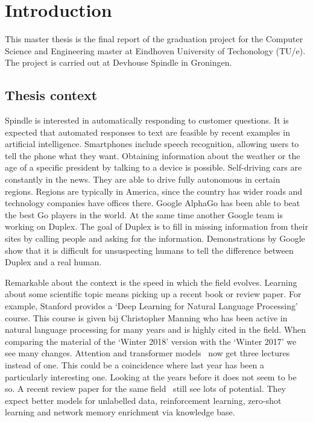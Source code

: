 \chapter{Introduction}
\label{ch:introduction}

\setcounter{page}{0}
This master thesis is the final report of the graduation project for the Computer Science and Engineering master at Eindhoven University of Techonology (TU/e).
The project is carried out at Devhouse Spindle in Groningen.

\section{Thesis context}
\label{sec:thesis_context}
Spindle is interested in automatically responding to customer questions.
It is expected that automated responses to text are feasible by recent examples in artificial intelligence.
Smartphones include speech recognition, allowing users to tell the phone what they want.
Obtaining information about the weather or the age of a specific president by talking to a device is possible.
Self-driving cars are constantly in the news.
They are able to drive fully autonomous in certain regions.
Regions are typically in America, since the country has wider roads and technology companies have offices there.
Google AlphaGo has been able to beat the best Go players in the world.
At the same time another Google team is working on Duplex.
The goal of Duplex is to fill in missing information from their sites by calling people and asking for the information.
Demonstrations by Google show that it is difficult for unsuspecting humans to tell the difference between Duplex and a real human.

Remarkable about the context is the speed in which the field evolves.
Learning about some scientific topic means picking up a recent book or review paper.
For example, Stanford provides a `Deep Learning for Natural Language Processing' course.
This course is given bij Christopher Manning who has been active in natural language processing for many years and is highly cited in the field.
When comparing the material of the `Winter 2018' version with the `Winter 2017' we see many changes.
Attention and transformer models~\citep{vaswani2017attention} now get three lectures instead of one.
This could be a coincidence where last year has been a particularly interesting one.
Looking at the years before it does not seem to be so.
A recent review paper for the same field~\citep{young2018recent} still see lots of potential.
They expect better models for unlabelled data, reinforcement learning, zero-shot learning and network memory enrichment via knowledge base.

